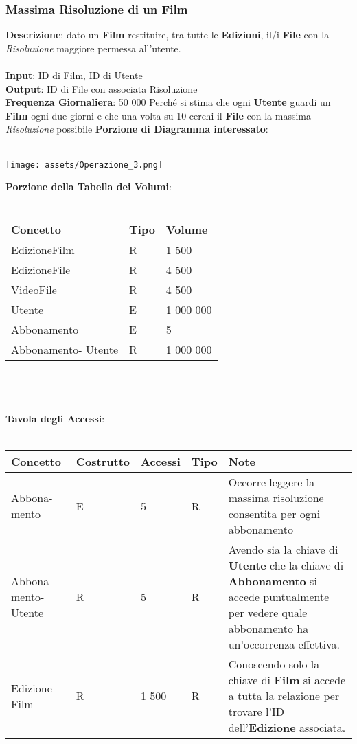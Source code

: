 \documentclass{article}
\begin{document}
\subsubsection{Massima Risoluzione di un Film}
\textbf{Descrizione}: dato un \textbf{Film} restituire, tra tutte le \textbf{Edizioni}, il/i \textbf{File} con la \textit{Risoluzione} maggiore permessa all'utente. \\ \\
\textbf{Input}: ID di Film, ID di Utente \\
\textbf{Output}: ID di File con associata Risoluzione \\
\textbf{Frequenza Giornaliera}: 50 000 Perché si stima che ogni \textbf{Utente} guardi un \textbf{Film} ogni due giorni e che una volta su 10 cerchi il \textbf{File} con la massima \textit{Risoluzione} possibile \newpage
\textbf{Porzione di Diagramma interessato}: \\ \\
\begin{center}
    \centering
    \texttt{[image: assets/Operazione\_3.png]}
\end{center}
%
%
%
%
%
%
%
%
\textbf{Porzione della Tabella dei Volumi}: \\ \\
\begin{tabular}{|C{2.6cm}|C{2.6cm}|C{2.6cm}|}
\hline
    \textbf{Concetto} & \textbf{Tipo} & \textbf{Volume} \\
\hline
 EdizioneFilm & R & 1 500 \\
\hline
 EdizioneFile & R & 4 500 \\
\hline
 VideoFile & R & 4 500 \\
\hline
 Utente & E & 1 000 000 \\
\hline 
 Abbonamento & E & 5 \\
\hline 
 Abbonamento- Utente & R & 1 000 000 \\
\hline
\end{tabular} \\ \\ \\
\textbf{Tavola degli Accessi}: \\ \\ 
\begin{tabular}{|C{1.7cm}|C{1.7cm}|C{1.3cm}|C{0.8cm}|C{5.1cm}|}
\hline
    \textbf{Concetto} & \textbf{Costrutto} & \textbf{Accessi} & \textbf{Tipo} & \textbf{Note} \\
\hline
    Abbona- mento & E & 5 & R & Occorre leggere la massima risoluzione consentita per ogni abbonamento \\
\hline
    Abbona- mento- Utente & R & 5 & R & Avendo sia la chiave di \textbf{Utente} che la chiave di \textbf{Abbonamento} si accede puntualmente per vedere quale abbonamento ha un'occorrenza effettiva. \\
\hline
    Edizione-Film & R & 1 500 & R & Conoscendo solo la chiave di \textbf{Film} si accede a tutta la relazione per trovare l'ID dell'\textbf{Edizione} associata. \\
\hline
\end{tabular}
\end{document}
